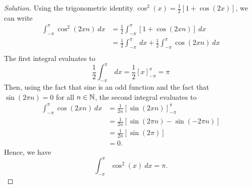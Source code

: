 \begin{enumerate}
        \begin{proof}[Solution]
            Using the trigonometric identity \( \cos^{2}(x) = \frac{ 1 }{ 2 }  [ 1 + \cos(2x)] \), we can write 
            \begin{align*}
                \int_{ - \pi  }^{ \pi  } \cos^{2}(2xn) \ dx &= \frac{ 1 }{ 2 } \int_{ - \pi  }^{ \pi } [ 1+ \cos(2xn) ]   \ dx \\
                                                          &= \frac{ 1 }{ 2 } \int_{ - \pi  }^{ \pi  }  \ dx + \frac{ 1 }{ 2 }  \int_{ - \pi  }^{ \pi  } \cos(2xn) \ dx \\
            \end{align*}
            The first integral evaluates to 
            \[  \frac{ 1 }{ 2 } \int_{ - \pi  }^{ \pi  }  \ dx = \frac{ 1 }{ 2 }  [ x]_{- \pi}^{\pi } = \pi  \]
            Then, using the fact that sine is an odd function and the fact that \( \sin(2 \pi n ) = 0  \) for all \( n \in \mathbb{N}  \), the second integral evaluates to
            \begin{align*}
                \int_{ - \pi  }^{ \pi  } \cos(2xn) \ dx &= \frac{ 1 }{ 2n } [ \sin(2x n)]_{- \pi}^{\pi } \\
                                                       &= \frac{ 1 }{ 2n } [ \sin( 2\pi n) - \sin(- 2 \pi n)] \\
                                                       &= \frac{ 1 }{ 2n } [ \sin(2 \pi)] \tag{ \( \sin(-2 \pi n) = -\sin(2 \pi n) \)} \\
                                                       &= 0.
            \end{align*}
            Hence, we have 
            \[  \int_{ - \pi  }^{ \pi  } \cos^{2}(x) \ dx = \pi. \]


\end{proof}
\end{enumerate}
